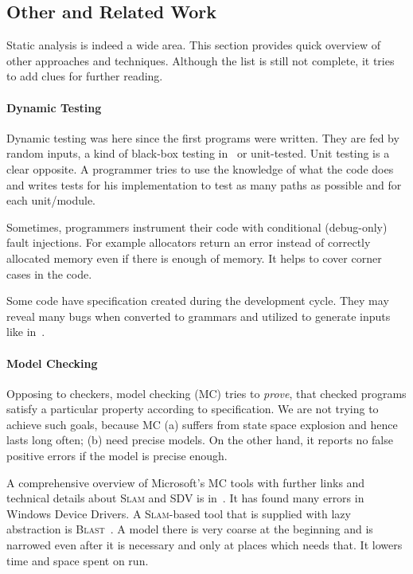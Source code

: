 \documentclass[11pt,a4paper]{article}
\begin{document}
\subsection{Other and Related Work}
Static analysis is indeed a wide area. This section provides quick overview
of other approaches and techniques. Although the list is still not complete,
it tries to add clues for further reading.

\paragraph{Dynamic Testing}
Dynamic testing was here since the first programs were written. They are fed
by random inputs, a kind of black-box testing
in~\cite{random1,random2,random3} or unit-tested. Unit testing is a clear
opposite. A programmer tries to use the knowledge of what the code does and
writes tests for his implementation to test as many paths as possible and for
each unit/module.

Sometimes, programmers instrument their code with conditional (debug-only)
fault injections. For example allocators return an error instead of correctly
allocated memory even if there is enough of memory. It helps to cover corner
cases in the code.

Some code have specification created during the development cycle. They may
reveal many bugs when converted to grammars and utilized to generate inputs
like in~\cite{grammar1,grammar2,grammar3}.

\paragraph{Model Checking} Opposing to checkers, model checking (MC) tries
to \emph{prove}, that checked programs satisfy a particular property according
to specification. We are not trying to achieve such goals, because MC (a)
suffers from state space explosion and hence lasts long often; (b) need
precise models. On the other hand, it reports no false positive errors if the
model is precise enough.

A comprehensive overview of Microsoft's MC tools with further links and
technical details about \textsc{Slam} and \textsc{SDV} is in~\cite{slam}. It
has found many errors in Windows Device Drivers. A \textsc{Slam}-based tool
that is supplied with lazy abstraction is \textsc{Blast}~\cite{blast}. A model
there is very coarse at the beginning and is narrowed even after it is
necessary and only at places which needs that. It lowers time and space spent
on run.
\end{document}
